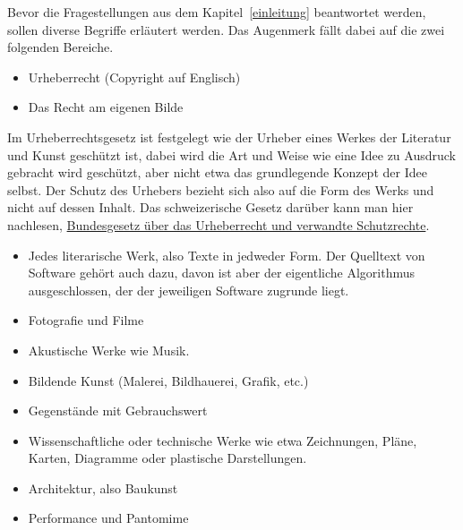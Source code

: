 
\label{das-werk}
Bevor die Fragestellungen aus dem Kapitel~\ref{einleitung} beantwortet werden, sollen diverse Begriffe erläutert werden.
Das Augenmerk fällt dabei auf die zwei folgenden Bereiche.
\begin{itemize}
    \item Urheberrecht (Copyright auf Englisch)
    \item Das Recht am eigenen Bilde
\end{itemize}

Im Urheberrechtsgesetz ist festgelegt wie der Urheber eines Werkes der Literatur und Kunst geschützt ist, dabei wird die
Art und Weise wie eine Idee zu Ausdruck gebracht wird geschützt, aber nicht etwa das grundlegende Konzept der Idee selbst.
Der Schutz des Urhebers bezieht sich also auf die Form des Werks und nicht auf dessen Inhalt.
Das schweizerische Gesetz darüber kann man hier nachlesen,
\href{https://www.admin.ch/opc/de/classified-compilation/19920251/index.html}{Bundesgesetz über das Urheberrecht und verwandte Schutzrechte}.
\newpage
{}
\begin{itemize}
    \item Jedes literarische Werk, also Texte in jedweder Form.
    Der Quelltext von Software gehört auch dazu, davon ist aber der eigentliche Algorithmus ausgeschlossen,
    der der jeweiligen Software zugrunde liegt.
    \item Fotografie und Filme
    \item Akustische Werke wie Musik.
    \item Bildende Kunst (Malerei, Bildhauerei, Grafik, etc.)
    \item Gegenstände mit Gebrauchswert
    \item Wissenschaftliche oder technische Werke wie etwa Zeichnungen, Pläne, Karten, Diagramme oder plastische Darstellungen.
    \item Architektur, also Baukunst
    \item Performance und Pantomime
\end{itemize}

